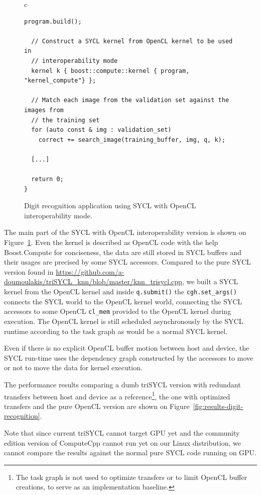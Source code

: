 \documentclass[sigplan, review]{acmart}
\begin{document}
\begin{figure}
\begin{tabular}{c}
\begin{lstlisting}[basicstyle=\scriptsize]
  program.build();

  // Construct a SYCL kernel from OpenCL kernel to be used in
  // interoperability mode
  kernel k { boost::compute::kernel { program, "kernel_compute"} };

  // Match each image from the validation set against the images from
  // the training set
  for (auto const & img : validation_set)
    correct += search_image(training_buffer, img, q, k);

  [...]

  return 0;
}
    \end{lstlisting}
  \end{tabular}
  \caption{Digit recognition application using SYCL with OpenCL
    interoperability mode.\label{fig:digit-SYCL-OpenCL-code}}
\end{figure}


The main part of the SYCL with OpenCL interoperability version is
shown on Figure~\ref{fig:digit-SYCL-OpenCL-code}. Even the kernel is
described as OpenCL code with the help Boost.Compute
\cite{Boost.Compute} for conciseness, the data are still stored in
SYCL buffers and their usages are precised by some SYCL
accessors. Compared to the pure SYCL version found in
\url{https://github.com/a-doumoulakis/triSYCL_knn/blob/master/knn_trisycl.cpp},
we built a SYCL kernel from the OpenCL kernel and inside
\lstinline|q.submit()| the \lstinline|cgh.set_args()| connects the
SYCL world to the OpenCL kernel world, connecting the SYCL accessors
to some OpenCL \lstinline|cl_mem| provided to the OpenCL kernel during
execution. The OpenCL kernel is still scheduled asynchronously by the
SYCL runtime according to the task graph as would be a normal SYCL
kernel.

Even if there is no explicit OpenCL buffer motion between host and
device, the SYCL run-time uses the dependency graph constructed by the
accessors to move or not to move the data for kernel execution.

The performance results comparing a dumb triSYCL version with
redundant transfers between host and device as a
reference\footnote{The task graph is not used to optimize transfers or
  to limit OpenCL buffer creations, to serve as an implementation
  baseline.}, the one with optimized transfers and the pure OpenCL
version are shown on Figure~\ref{fig:results-digit-recognition}.

Note that since current triSYCL \cite{triSYCL} cannot target GPU yet
and the community edition version of ComputeCpp \cite{ComputeCpp}
cannot run yet on our Linux distribution, we cannot compare the
results against the normal pure SYCL code running on GPU.
\end{document}
